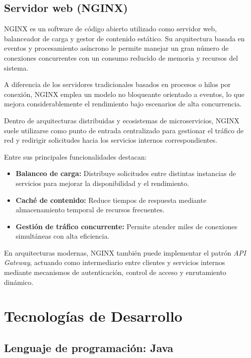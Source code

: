 \documentclass[12pt, oneside, letterpaper]{book}
\begin{document}
\subsection{Servidor web (NGINX)}

NGINX es un software de código abierto utilizado como servidor web, balanceador de carga y gestor de contenido estático. Su arquitectura basada en eventos y procesamiento asíncrono le permite manejar un gran número de conexiones concurrentes con un consumo reducido de memoria y recursos del sistema.

A diferencia de los servidores tradicionales basados en procesos o hilos por conexión, NGINX emplea un modelo no bloqueante orientado a eventos, lo que mejora considerablemente el rendimiento bajo escenarios de alta concurrencia.

Dentro de arquitecturas distribuidas y ecosistemas de microservicios, NGINX suele utilizarse como punto de entrada centralizado para gestionar el tráfico de red y redirigir solicitudes hacia los servicios internos correspondientes.

Entre sus principales funcionalidades destacan:

\begin{itemize}

\item \textbf{Balanceo de carga:} Distribuye solicitudes entre distintas instancias de servicios para mejorar la disponibilidad y el rendimiento.

\item \textbf{Caché de contenido:} Reduce tiempos de respuesta mediante almacenamiento temporal de recursos frecuentes.

\item \textbf{Gestión de tráfico concurrente:} Permite atender miles de conexiones simultáneas con alta eficiencia.
\end{itemize}

En arquitecturas modernas, NGINX también puede implementar el patrón \textit{API Gateway}, actuando como intermediario entre clientes y servicios internos mediante mecanismos de autenticación, control de acceso y enrutamiento dinámico.

\section{Tecnologías de Desarrollo}

\subsection{Lenguaje de programación: Java}
\end{document}
